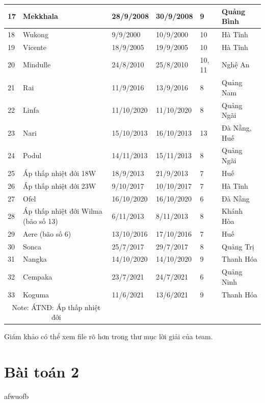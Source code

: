 \documentclass[12pt]{report}
\begin{document}
\begin{flushleft}
\begin{table}[!ht]
\begin{adjustbox}{width = 1.2\linewidth, center}
\begin{tabular}{|l|l|l|l|l|l|}
			17 & Mekkhala & 28/9/2008 & 30/9/2008 & 9 & Quảng Bình \\ \hline
			18 & Wukong & 9/9/2000 & 10/9/2000 & 10 & Hà Tĩnh \\ \hline
			19 & Vicente & 18/9/2005 & 19/9/2005 & 10 & Hà Tĩnh \\ \hline
			20 & Mindulle & 24/8/2010 & 25/8/2010 & 10, 11 & Nghệ An \\ \hline
			21 & Rai & 11/9/2016 & 13/9/2016 & 8 & Quảng Nam \\ \hline
			22 & Linfa & 11/10/2020 & 11/10/2020 & 8 & Quảng Ngãi \\ \hline
			23 & Nari & 15/10/2013 & 16/10/2013 & 13 & Đà Nẵng, Huế \\ \hline
			24 & Podul & 14/11/2013 & 15/11/2013 & 8 & Quảng Ngãi \\ \hline
			25 & Áp thấp nhiệt đới 18W & 18/9/2013 & 21/9/2013 & 7 & Huế \\ \hline
			26 & Áp thấp nhiệt đới 23W & 9/10/2017 & 10/10/2017 & 7 & Hà Tĩnh \\ \hline
			27 & Ofel & 16/10/2020 & 16/10/2020 & 6 & Đà Nẵng \\ \hline
			28 & Áp thấp nhiệt đới Wilma (bão số 13) & 6/11/2013 & 8/11/2013 & 8 & Khánh Hòa \\ \hline
			29 & Aere (bão số 6) & 13/10/2016 & 17/10/2016 & 7 & Huế \\ \hline
			30 & Sonca & 25/7/2017 & 29/7/2017 & 8 & Quảng Trị \\ \hline
			31 & Nangka & 14/10/2020 & 14/10/2020 & 9 & Thanh Hóa \\ \hline
			32 & Cempaka & 23/7/2021 & 24/7/2021 & 6 & Quảng Ninh \\ \hline
			33 & Koguma & 11/6/2021 & 13/6/2021 & 9 & Thanh Hóa \\ \hline

		\multicolumn{2}{c}{\footnotesize Note: ÁTNĐ: Áp thấp nhiệt đới} \\ \hline
		\end{tabular}
		\end{adjustbox}
	\end{table}

	Giám khảo có thể xem file rõ hơn trong thư mục lời giải của team.
\end{flushleft}

\chapter{Bài toán 2} %
\label{cha:bài_toán_2}
afwuofb
\end{document}
